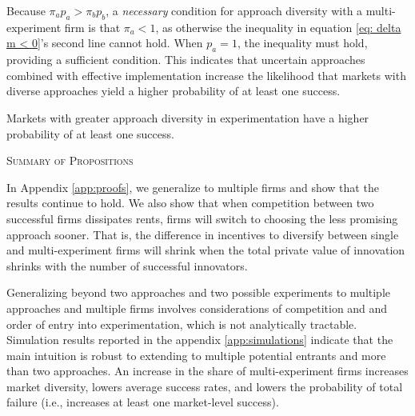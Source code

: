 Because $\pi_a p_a > \pi_b p_b$, a \textit{necessary} condition for approach diversity with a multi-experiment firm is that $\pi_a < 1$, as otherwise the inequality in equation \ref{eq: delta m < 0}'s second line cannot hold. When $p_a = 1$, the inequality must hold, providing a sufficient condition. This indicates that uncertain approaches combined with effective implementation increase the likelihood that markets with diverse approaches yield a higher probability of at least one success.


\begin{hypothesis}\label{prop:atleastone}
    Markets with greater approach diversity in experimentation have a higher probability of at least one success.
\end{hypothesis}


\begin{table}[h!]
    \centering
    \footnotesize
    \caption{\textsc{Summary of Propositions}}
    \vspace{1em}
    
    \label{tab:propositions_summary}
    \vspace{1em}
\end{table}

In Appendix \ref{app:proofs}, we generalize to multiple firms and show that the results continue to hold.  We also show that when competition between two successful firms dissipates rents, firms will switch to choosing the less promising approach sooner.  That is, the difference in incentives to diversify between single and multi-experiment firms will shrink when the total private value of innovation shrinks with the number of successful innovators.

Generalizing beyond two approaches and two possible experiments to multiple approaches and multiple firms involves considerations of competition and and order of entry into experimentation, which is not analytically tractable. Simulation results reported in the appendix \ref{app:simulations} indicate that the main intuition is robust to extending to multiple potential entrants and more than two approaches. An increase in the share of multi-experiment firms increases market diversity, lowers average success rates, and lowers the probability of total failure (i.e., increases at least one market-level success).


